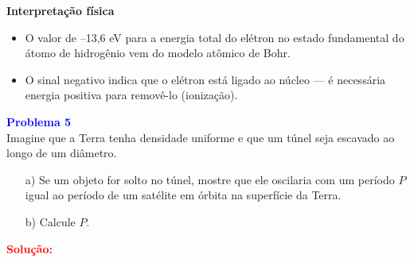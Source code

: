 \documentclass[a4paper,12pt]{article}
\begin{document}
\textbf{\large Interpretação física}

\begin{itemize}
    \item O valor de –13,6 eV para a energia total do elétron no estado fundamental 
    do átomo de hidrogênio vem do modelo atômico de Bohr.
    \item O sinal negativo indica que o elétron está ligado ao núcleo — é necessária 
    energia positiva para removê-lo (ionização).
\end{itemize}

\begin{flushleft}
\textbf{\textcolor{blue}{\Large Problema 5}}\\

Imagine que a Terra tenha densidade uniforme e que um túnel seja escavado ao longo de um diâmetro.

\begin{enumerate}
    \item[a)] Se um objeto for solto no túnel, mostre que ele oscilaria com um período \( P \) igual ao 
    período de um satélite em órbita na superfície da Terra.
    \item[b)] Calcule \( P \).
\end{enumerate}

\begin{center}
\end{center}

\textcolor{red}{\textbf{Solução:}}\\


\end{flushleft}
\end{document}
